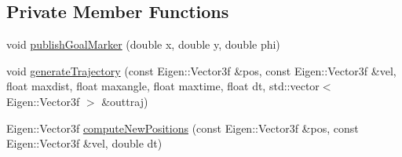 \subsection*{Private Member Functions}
\begin{DoxyCompactItemize}
\item 
void \hyperlink{classcl__move__base__z_1_1__local__planner_1_1ForwardLocalPlanner_a0fe34b826708fe2a18db1f04aaf1d152}{publish\+Goal\+Marker} (double x, double y, double phi)
\item 
void \hyperlink{classcl__move__base__z_1_1__local__planner_1_1ForwardLocalPlanner_a67e5372580636b6e1d04a576701a5458}{generate\+Trajectory} (const Eigen\+::\+Vector3f \&pos, const Eigen\+::\+Vector3f \&vel, float maxdist, float maxangle, float maxtime, float dt, std\+::vector$<$ Eigen\+::\+Vector3f $>$ \&outtraj)
\item 
Eigen\+::\+Vector3f \hyperlink{classcl__move__base__z_1_1__local__planner_1_1ForwardLocalPlanner_ab6676f72aaa3575897429fa72498930a}{compute\+New\+Positions} (const Eigen\+::\+Vector3f \&pos, const Eigen\+::\+Vector3f \&vel, double dt)
\end{DoxyCompactItemize}
